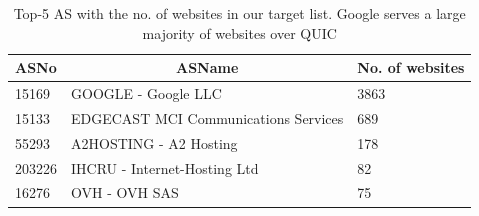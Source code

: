 \begin{frame}
\begin{table}[ht]
    \begin{tabular}{@{}|l|l|l|@{}}
        \toprule
        \textbf{ASNo} & \multicolumn{1}{c|}{\textbf{ASName}} & \textbf{No. of websites} \\ \midrule
        15169 & GOOGLE - Google LLC & 3863 \\ \midrule
        15133 & EDGECAST MCI Communications Services & 689 \\ \midrule
        55293 & A2HOSTING - A2 Hosting & 178 \\ \midrule
        203226 & IHCRU - Internet-Hosting Ltd & 82 \\ \midrule
        16276 & OVH - OVH SAS & 75 \\ \bottomrule
    \end{tabular}
    \caption{Top-5 AS with the no. of websites in our target list. Google serves a large majority of websites over QUIC}
    \label{table:top-5-as-with}
\end{table}
\end{frame}
\clearpage


